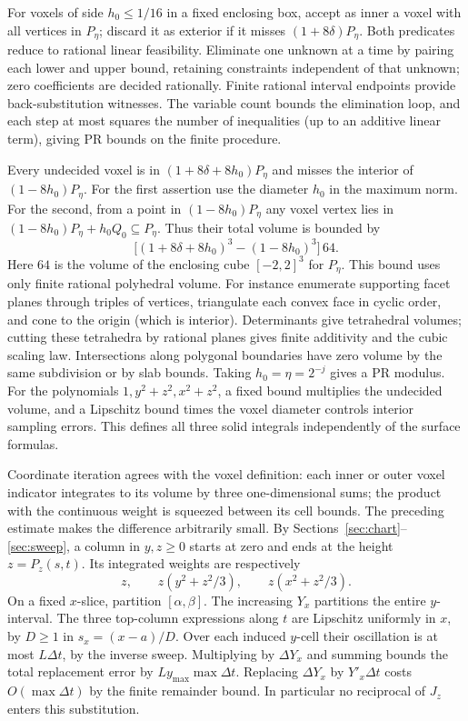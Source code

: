 \documentclass[11pt,letterpaper]{article}
\newcommand{\subt}[1]{\par\medskip\noindent{\color{sea}\bfseries #1}\enspace}
\begin{document}
\newpage
For voxels of side \(h_0\le1/16\) in a fixed enclosing box, accept as inner a voxel with all vertices in \(P_\eta\); discard it as exterior if it misses \((1+8\delta)P_\eta\). Both predicates reduce to rational linear feasibility. Eliminate one unknown at a time by pairing each lower and upper bound, retaining constraints independent of that unknown; zero coefficients are decided rationally. Finite rational interval endpoints provide back-substitution witnesses. The variable count bounds the elimination loop, and each step at most squares the number of inequalities (up to an additive linear term), giving PR bounds on the finite procedure.

Every undecided voxel is in \((1+8\delta+8h_0)P_\eta\) and misses the interior of \((1-8h_0)P_\eta\). For the first assertion use the diameter \(h_0\) in the maximum norm. For the second, from a point in \((1-8h_0)P_\eta\) any voxel vertex lies in \((1-8h_0)P_\eta+h_0Q_0\subseteq P_\eta\). Thus their total volume is bounded by
\[
 \big[(1+8\delta+8h_0)^3-(1-8h_0)^3\big]\,64.
\]
Here \(64\) is the volume of the enclosing cube \([-2,2]^3\) for \(P_\eta\). This bound uses only finite rational polyhedral volume. For instance enumerate supporting facet planes through triples of vertices, triangulate each convex face in cyclic order, and cone to the origin (which is interior). Determinants give tetrahedral volumes; cutting these tetrahedra by rational planes gives finite additivity and the cubic scaling law. Intersections along polygonal boundaries have zero volume by the same subdivision or by slab bounds. Taking \(h_0=\eta=2^{-j}\) gives a PR modulus. For the polynomials \(1,y^2+z^2,x^2+z^2\), a fixed bound multiplies the undecided volume, and a Lipschitz bound times the voxel diameter controls interior sampling errors. This defines all three solid integrals independently of the surface formulas.

\subt{Integration by columns.}
Coordinate iteration agrees with the voxel definition: each inner or outer voxel indicator integrates to its volume by three one-dimensional sums; the product with the continuous weight is squeezed between its cell bounds. The preceding estimate makes the difference arbitrarily small. By Sections~\ref{sec:chart}--\ref{sec:sweep}, a column in \(y,z\ge0\) starts at zero and ends at the height \(z=P_z(s,t)\). Its integrated weights are respectively
\[
 z,\qquad z(y^2+z^2/3),\qquad z(x^2+z^2/3).
\]
On a fixed \(x\)-slice, partition \([\alpha,\beta]\). The increasing \(Y_x\) partitions the entire \(y\)-interval. The three top-column expressions along \(t\) are Lipschitz uniformly in \(x\), by \(D\ge1\) in \(s_x=(x-a)/D\). Over each induced \(y\)-cell their oscillation is at most \(L\Delta t\), by the inverse sweep. Multiplying by \(\Delta Y_x\) and summing bounds the total replacement error by \(Ly_{\max}\max\Delta t\). Replacing \(\Delta Y_x\) by \(Y'_x\Delta t\) costs \(O(\max\Delta t)\) by the finite remainder bound. In particular no reciprocal of \(J_z\) enters this substitution.
\end{document}
